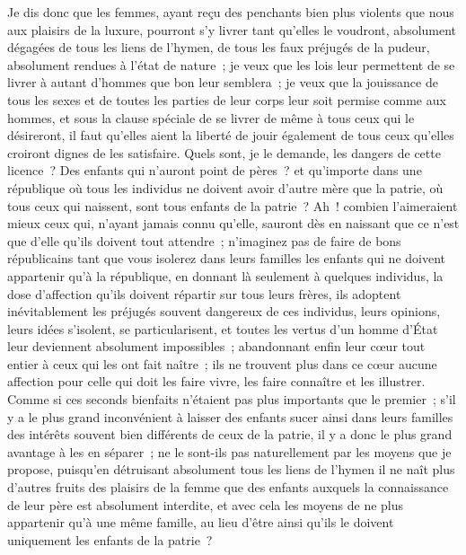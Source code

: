 \documentclass[french,twoside]{book} %
\begin{document}
Je dis donc que les femmes, ayant reçu des penchants bien plus violents que nous aux plaisirs de la luxure, pourront s’y livrer tant qu’elles le voudront, absolument dégagées de tous les liens de l’hymen, de tous les faux préjugés de la pudeur, absolument rendues à l’état de nature ; je veux que les lois leur permettent de se livrer à autant d’hommes que bon leur semblera ; je veux que la jouissance de tous les sexes et de toutes les parties de leur corps leur soit permise comme aux hommes, et sous la clause spéciale de se livrer de même à tous ceux qui le désireront, il faut qu’elles aient la liberté de jouir également de tous ceux qu’elles croiront dignes de les satisfaire. Quels sont, je le demande, les dangers de cette licence ? Des enfants qui n’auront point de pères ? et qu’importe dans une république où tous les individus ne doivent avoir d’autre mère que la patrie, où tous ceux qui naissent, sont tous enfants de la patrie ? Ah ! combien l’aimeraient mieux ceux qui, n’ayant jamais connu qu’elle, sauront dès en naissant que ce n’est que d’elle qu’ils doivent tout attendre ; n’imaginez pas de faire de bons républicains tant que vous isolerez dans leurs familles les enfants qui ne doivent appartenir qu’à la république, en donnant là seulement à quelques individus, la dose d’affection qu’ils doivent répartir sur tous leurs frères, ils adoptent inévitablement les préjugés souvent dangereux de ces individus, leurs opinions, leurs idées s’isolent, se particularisent, et toutes les vertus d’un homme d’État leur deviennent absolument impossibles ; abandonnant enfin leur cœur tout entier à ceux qui les ont fait naître ; ils ne trouvent plus dans ce cœur aucune affection pour celle qui doit les faire vivre, les faire connaître et les illustrer. Comme si ces seconds bienfaits n’étaient pas plus importants que le premier ; s’il y a le plus grand inconvénient à laisser des enfants sucer ainsi dans leurs familles des intérêts souvent bien différents de ceux de la patrie, il y a donc le plus grand avantage à les en séparer ; ne le sont-ils pas naturellement par les moyens que je propose, puisqu’en détruisant absolument tous les liens de l’hymen il ne naît plus d’autres fruits des plaisirs de la femme que des enfants auxquels la connaissance de leur père est absolument interdite, et avec cela les moyens de ne plus appartenir qu’à une même famille, au lieu d’être ainsi qu’ils le doivent uniquement les enfants de la patrie ?\par
\end{document}
